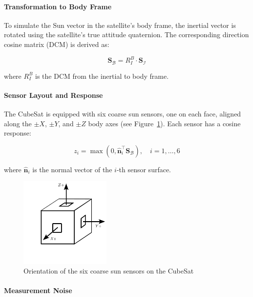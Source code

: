 \paragraph{Transformation to Body Frame}

To simulate the Sun vector in the satellite’s body frame, the inertial vector is rotated using the satellite's true attitude quaternion. The corresponding direction cosine matrix (DCM) is derived as:

\begin{equation}
     \mathbf{S}_\mathcal{B} = R_I^B \cdot \mathbf{S}_\mathcal{I}
\end{equation}

where $R_I^B$ is the DCM from the inertial to body frame.

\paragraph{Sensor Layout and Response}

The CubeSat is equipped with six coarse sun sensors, one on each face, aligned along the $\pm X$, $\pm Y$, and $\pm Z$ body axes (see Figure~\ref{fig:CSS}). Each sensor has a cosine response:

\begin{equation}
     z_i = \max\left(0, \hat{\mathbf{n}}_i^\top \mathbf{S}_\mathcal{B} \right), \quad i = 1, \dots, 6
\end{equation}

where $\hat{\mathbf{n}}_i$ is the normal vector of the $i$-th sensor surface.

\begin{figure}[H]
    \centering
    \includegraphics[width=0.4\textwidth]{figures/modelling/CSS.pdf}
    \caption{Orientation of the six coarse sun sensors on the CubeSat}
    \label{fig:CSS}
\end{figure}

\paragraph{Measurement Noise}

